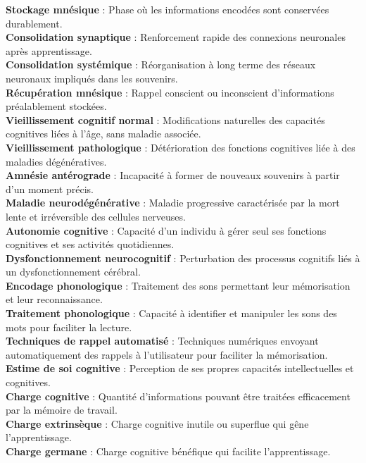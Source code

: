 \documentclass[12pt,a4paper]{report}
\begin{document}
\textbf{Stockage mnésique} : Phase où les informations encodées sont conservées durablement.\\
\textbf{Consolidation synaptique} : Renforcement rapide des connexions neuronales après apprentissage.\\
\textbf{Consolidation systémique} : Réorganisation à long terme des réseaux neuronaux impliqués dans les souvenirs.\\
\textbf{Récupération mnésique} : Rappel conscient ou inconscient d'informations préalablement stockées.\\
\textbf{Vieillissement cognitif normal} : Modifications naturelles des capacités cognitives liées à l’âge, sans maladie associée.\\
\textbf{Vieillissement pathologique} : Détérioration des fonctions cognitives liée à des maladies dégénératives.\\
\textbf{Amnésie antérograde} : Incapacité à former de nouveaux souvenirs à partir d’un moment précis.\\
\textbf{Maladie neurodégénérative} : Maladie progressive caractérisée par la mort lente et irréversible des cellules nerveuses.\\
\textbf{Autonomie cognitive} : Capacité d’un individu à gérer seul ses fonctions cognitives et ses activités quotidiennes.\\
\textbf{Dysfonctionnement neurocognitif} : Perturbation des processus cognitifs liés à un dysfonctionnement cérébral.\\
\textbf{Encodage phonologique} : Traitement des sons permettant leur mémorisation et leur reconnaissance.\\
\textbf{Traitement phonologique} : Capacité à identifier et manipuler les sons des mots pour faciliter la lecture.\\
\textbf{Techniques de rappel automatisé} : Techniques numériques envoyant automatiquement des rappels à l’utilisateur pour faciliter la mémorisation.\\
\textbf{Estime de soi cognitive} : Perception de ses propres capacités intellectuelles et cognitives.\\
\textbf{Charge cognitive} : Quantité d'informations pouvant être traitées efficacement par la mémoire de travail.\\
\textbf{Charge extrinsèque} : Charge cognitive inutile ou superflue qui gêne l’apprentissage.\\
\textbf{Charge germane} : Charge cognitive bénéfique qui facilite l’apprentissage.\\
\end{document}
